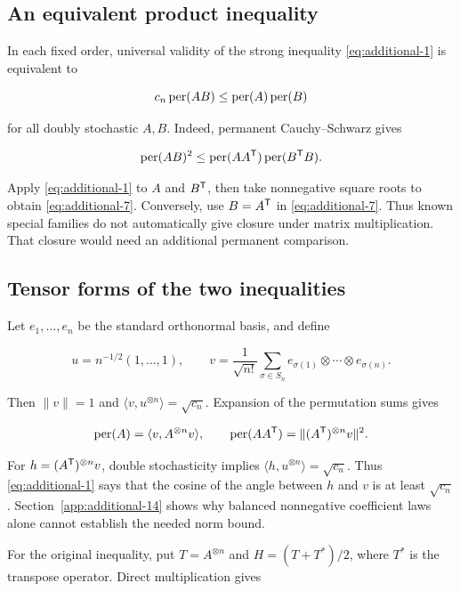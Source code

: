 \subsection{An equivalent product inequality}\label{app:additional-21}

In each fixed order, universal validity of the strong inequality \eqref{eq:additional-1} is equivalent to

\begin{equation}
c_n\operatorname{per}(AB)
\le\operatorname{per}(A)\operatorname{per}(B)
\label{eq:additional-7}
\end{equation}

for all doubly stochastic \(A,B\). Indeed, permanent Cauchy--Schwarz gives

\[
\operatorname{per}(AB)^2
\le\operatorname{per}(AA^{\mathsf{T}})\operatorname{per}(B^{\mathsf{T}}B).
\]

Apply \eqref{eq:additional-1} to \(A\) and \(B^{\mathsf{T}}\), then take nonnegative square roots to obtain \eqref{eq:additional-7}. Conversely, use \(B=A^{\mathsf{T}}\) in \eqref{eq:additional-7}. Thus known special families do not automatically give closure under matrix multiplication. That closure would need an additional permanent comparison.

\subsection{Tensor forms of the two inequalities}\label{app:additional-22}

Let \(e_1,\ldots,e_n\) be the standard orthonormal basis, and define

\[
u=n^{-1/2}(1,\ldots,1),\qquad
v=\frac1{\sqrt{n!}}\sum_{\sigma\in S_n}
e_{\sigma(1)}\otimes\cdots\otimes e_{\sigma(n)}.
\]

Then \(\|v\|=1\) and \(\langle v,u^{\otimes n}\rangle=\sqrt{c_n}\). Expansion of the permutation sums gives

\[
\operatorname{per}(A)=\langle v,A^{\otimes n}v\rangle,\qquad
\operatorname{per}(AA^{\mathsf{T}})=\|(A^{\mathsf{T}})^{\otimes n}v\|^2.
\]

For \(h=(A^{\mathsf{T}})^{\otimes n}v\), double stochasticity implies \(\langle h,u^{\otimes n}\rangle=\sqrt{c_n}\). Thus \eqref{eq:additional-1} says that the cosine of the angle between \(h\) and \(v\) is at least \(\sqrt{c_n}\). Section~\ref{app:additional-14} shows why balanced nonnegative coefficient laws alone cannot establish the needed norm bound.

For the original inequality, put \(T=A^{\otimes n}\) and \(H=(T+T^*)/2\), where \(T^*\) is the transpose operator. Direct multiplication gives

